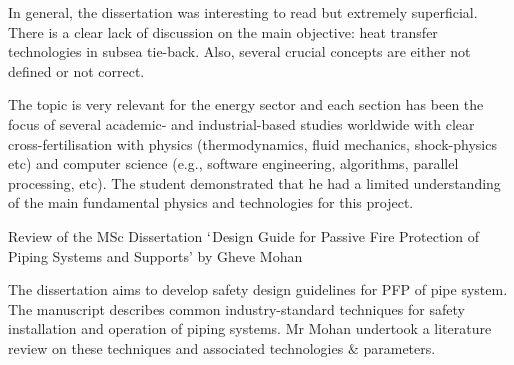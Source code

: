 \documentclass[14pt,twoside]{report}
\begin{document}
In general, the dissertation was interesting to read but extremely superficial. There is a clear lack of discussion on the main objective: heat transfer technologies in subsea tie-back. Also, several crucial concepts are either not defined or not correct.

The topic is very relevant for the energy sector and each section has been the focus of several academic- and industrial-based studies worldwide with clear cross-fertilisation with physics (thermodynamics, fluid mechanics, shock-physics etc) and computer science (e.g., software engineering, algorithms, parallel processing, etc). The student demonstrated that he had a limited understanding of the main fundamental physics and technologies for this project.



\clearpage




\bigskip

\begin{center}
{\Large Review of the MSc Dissertation $\lq$Design Guide for Passive Fire Protection of Piping Systems and Supports' by Gheve Mohan}
\end{center}

\medskip

The dissertation aims to develop safety design guidelines for PFP of pipe system. The manuscript describes common industry-standard techniques for safety installation and operation of piping systems. Mr Mohan undertook a literature review on these techniques and associated technologies $\&$ parameters.
\end{document}
